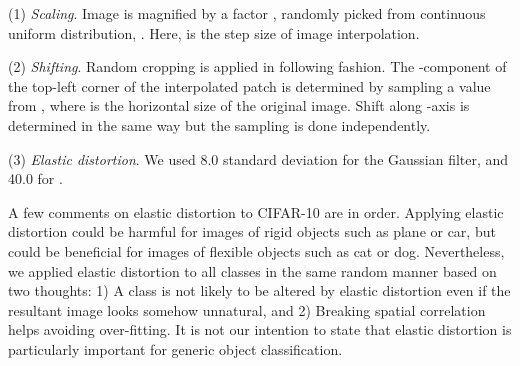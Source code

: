 \documentclass[10pt,twocolumn,letterpaper]{article}
\begin{document}
\noindent
(1) {\it Scaling}.
Image is magnified by a factor , randomly picked from continuous uniform distribution, .
Here,  is the step size of image interpolation.

\noindent
(2) {\it Shifting}.
Random cropping is applied in following fashion.
The -component of the top-left corner of the interpolated patch is determined by 
sampling a value from ,
where  is the horizontal size of the original image.
Shift along -axis is determined in the same way but the sampling is done independently.

\noindent
(3) {\it Elastic distortion}.
We used 8.0 standard deviation for the Gaussian filter, and 40.0 for .

A few comments on elastic distortion to CIFAR-10 are in order.
Applying elastic distortion could be harmful for 
images of rigid objects such as plane or car, 
but could be beneficial for images of flexible objects
such as cat or dog.
Nevertheless, we applied elastic distortion to all classes in the same random manner based on two thoughts:
1) A class is not likely to be 
altered by elastic distortion even if 
the resultant image looks somehow unnatural, and 
2) Breaking spatial correlation helps avoiding over-fitting.
It is not our intention to state that 
elastic distortion is particularly important for generic object classification.
\end{document}
